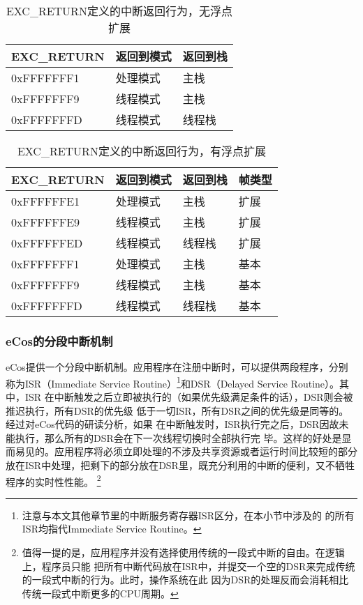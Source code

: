 \begin{table}[htb]
	\centering
	\caption{EXC\_RETURN定义的中断返回行为，无浮点扩展}
	\label{tab:exe_return_noFP}
	\begin{tabularx}{\linewidth}{XXX}
		\toprule[1.5pt]
		{\heiti EXC\_RETURN} & {\heiti 返回到模式} & {\heiti 返回到栈}\\
		\midrule[1pt]
		0xFFFFFFF1 & 处理模式 & 主栈 \\
		\midrule[0.5pt]
		0xFFFFFFF9 & 线程模式 & 主栈 \\
		\midrule[0.5pt]
		0xFFFFFFFD & 线程模式 & 线程栈 \\
		\bottomrule[1.5pt]
	\end{tabularx}
\end{table}

\begin{table}[htb]
	\centering
	\caption{EXC\_RETURN定义的中断返回行为，有浮点扩展}
	\label{tab:exe_return_FP}
	\begin{tabularx}{\linewidth}{XXXX}
		\toprule[1.5pt]
		{\heiti EXC\_RETURN} & {\heiti 返回到模式} & {\heiti 返回到栈} &
		{\heiti 帧类型}\\
		\midrule[1pt]
		0xFFFFFFE1 & 处理模式 & 主栈 & 扩展\\
		\midrule[0.5pt]
		0xFFFFFFE9 & 线程模式 & 主栈 & 扩展\\
		\midrule[0.5pt]
		0xFFFFFFED & 线程模式 & 线程栈 & 扩展\\
		\midrule[0.5pt]
		0xFFFFFFF1 & 处理模式 & 主栈 & 基本\\
		\midrule[0.5pt]
		0xFFFFFFF9 & 线程模式 & 主栈 & 基本\\
		\midrule[0.5pt]
		0xFFFFFFFD & 线程模式 & 线程栈 & 基本\\
		\bottomrule[1.5pt]
	\end{tabularx}
\end{table}

\subsubsection{eCos的分段中断机制} 
\label{subsubsec:ecos_intr}

eCos提供一个分段中断机制。应用程序在注册中断时，可以提供两段程序，分别称为ISR（Immediate
Service Routine）\footnote{注意与本文其他章节里的中断服务寄存器ISR区分，在本小节中涉及的
的所有ISR均指代Immediate Service Routine。}和DSR（Delayed Service Routine）。其中，ISR
在中断触发之后立即被执行的（如果优先级满足条件的话），DSR则会被推迟执行，所有DSR的优先级
低于一切ISR，所有DSR之间的优先级是同等的。\cite{ecos_isr}经过对eCos代码的研读分析，如果
在中断触发时，ISR执行完之后，DSR因故未能执行，那么所有的DSR会在下一次线程切换时全部执行完
毕。这样的好处是显而易见的。应用程序将必须立即处理的不涉及共享资源或者运行时间比较短的部分
放在ISR中处理，把剩下的部分放在DSR里，既充分利用的中断的便利，又不牺牲程序的实时性性能。
\footnote{值得一提的是，应用程序并没有选择使用传统的一段式中断的自由。在逻辑上，程序员只能
把所有中断代码放在ISR中，并提交一个空的DSR来完成传统的一段式中断的行为。此时，操作系统在此
因为DSR的处理反而会消耗相比传统一段式中断更多的CPU周期。}

